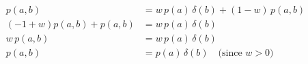\documentclass[12pt]{article}
\title{}
\date{\today}
\author{Knud Sønderbek}
\begin{document}
\maketitle
\thispagestyle{empty}
\newpage
\tableofcontents
\thispagestyle{empty}
\newpage
{}

\begin{align*}
       p(a,b) &= w \, p(a) \, \delta(b) + (1 - w) \, p(a, b) \\
       (-1+w)p(a,b) + p(a,b) &= w \, p(a) \, \delta(b) \\
        w \, p(a,b) &= w \, p(a) \, \delta(b) \\
        p(a,b) &= p(a) \, \delta(b) \quad \text{(since $w > 0$)} \\
\end{align*}
\end{document}
